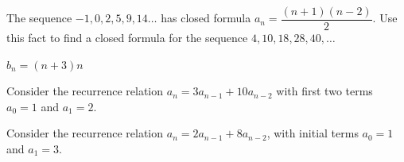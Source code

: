\begin{questions}
\question The sequence $-1, 0, 2, 5, 9, 14\ldots$ has closed formula $a_n = \dfrac{(n+1)(n-2)}{2}$.  Use this fact to find a closed formula for the sequence $4, 10, 18, 28, 40, \ldots$

	\begin{answer}
		 $b_n = (n+3)n$
	\end{answer}





\question Consider the recurrence relation $a_n = 3a_{n-1} + 10 a_{n-2}$ with first two terms $a_0 = 1$ and $a_1 = 2$.

	\begin{answer}
	\end{answer}





\question Consider the recurrence relation $a_n = 2a_{n-1} + 8a_{n-2}$, with initial terms $a_0 = 1$ and $a_1= 3$.
\end{questions}

